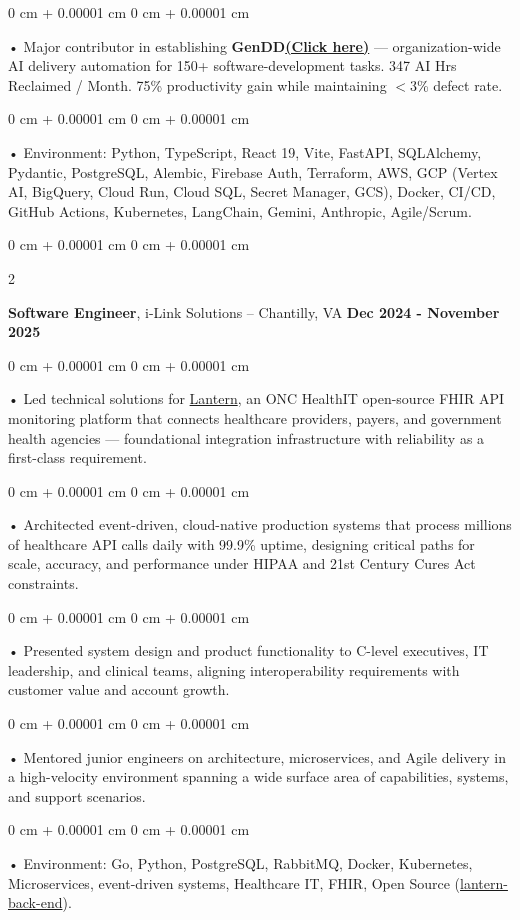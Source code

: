 \documentclass[10pt, letterpaper]{article}
\newenvironment{onecolentry}{
    \begin{adjustwidth}{
        0 cm + 0.00001 cm
    }{
        0 cm + 0.00001 cm
    }
}{
    \end{adjustwidth}
} %
\newenvironment{twocolentry}[2][]{
    \onecolentry
    \def\secondColumn{#2}
    \setcolumnwidth{\fill, 4.5 cm}
    \begin{paracol}{2}
}{
    \switchcolumn \raggedleft \secondColumn
    \end{paracol}
    \endonecolentry
} %
\begin{document}
        \begin{onecolentry}
             • Major contributor in establishing \textbf{GenDD}\href{https://hatchworks.com/generative-driven-development/}{\textbf{(Click here)}} --- organization-wide AI delivery automation for 150+ software-development tasks. 347 AI Hrs Reclaimed / Month. 75\% productivity gain while maintaining $<$3\% defect rate.
        \end{onecolentry}
        \begin{onecolentry}
             • Environment: Python, TypeScript, React 19, Vite, FastAPI, SQLAlchemy, Pydantic, PostgreSQL, Alembic, Firebase Auth, Terraform, AWS, GCP (Vertex AI, BigQuery, Cloud Run, Cloud SQL, Secret Manager, GCS), Docker, CI/CD, GitHub Actions, Kubernetes, LangChain, Gemini, Anthropic, Agile/Scrum.
        \end{onecolentry}

        \vspace{0.1cm}

        \begin{twocolentry}{
            \textbf{Dec 2024 - November 2025}
        }
            \textbf{Software Engineer}, i-Link Solutions -- Chantilly, VA\end{twocolentry}


        \begin{onecolentry}
             • Led technical solutions for \href{https://lantern.healthit.gov/?tab=dashboard_tab}{Lantern}, an ONC HealthIT open-source FHIR API monitoring platform that connects healthcare providers, payers, and government health agencies --- foundational integration infrastructure with reliability as a first-class requirement.
        \end{onecolentry}
        \begin{onecolentry}
             • Architected event-driven, cloud-native production systems that process millions of healthcare API calls daily with 99.9\% uptime, designing critical paths for scale, accuracy, and performance under HIPAA and 21st Century Cures Act constraints.
        \end{onecolentry}
        \begin{onecolentry}
             • Presented system design and product functionality to C-level executives, IT leadership, and clinical teams, aligning interoperability requirements with customer value and account growth.
        \end{onecolentry}
        \begin{onecolentry}
             • Mentored junior engineers on architecture, microservices, and Agile delivery in a high-velocity environment spanning a wide surface area of capabilities, systems, and support scenarios.
        \end{onecolentry}
        \begin{onecolentry}
             • Environment: Go, Python, PostgreSQL, RabbitMQ, Docker, Kubernetes, Microservices, event-driven systems, Healthcare IT, FHIR, Open Source (\href{https://github.com/onc-healthit/lantern-back-end}{lantern-back-end}).
        \end{onecolentry}
        \vspace{0.1cm}
\end{document}
